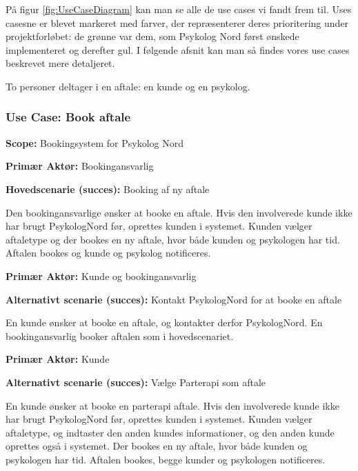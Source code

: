 På figur \ref{fig:UseCaseDiagram} kan man se alle de use cases vi fandt frem til.
Uses casesne er blevet markeret med farver, der repræsenterer deres prioritering under projektforløbet: de grønne var dem, som Psykolog Nord først ønskede implementeret og derefter gul.
I følgende afsnit kan man så findes vores use cases beskrevet mere detaljeret. 

To personer deltager i en aftale: en kunde og en psykolog.

\subsubsection{Use Case: Book aftale}\label{usecase:bookaftale}
{\setlength{\parindent}{0cm}
\textbf{Scope:} Bookingsystem for Psykolog Nord

\textbf{Primær Aktør:} Bookingansvarlig

\textbf{Hovedscenarie (succes):} Booking af ny aftale

Den bookingansvarlige ønsker at booke en aftale.
Hvis den involverede kunde ikke har brugt PsykologNord før, oprettes kunden i systemet.
Kunden vælger aftaletype og der bookes en ny aftale, hvor både kunden og psykologen har tid. 
Aftalen bookes og kunde og psykolog notificeres.

\textbf{Primær Aktør:} Kunde og bookingansvarlig

\textbf{Alternativt scenarie (succes):} Kontakt PsykologNord for at booke en aftale

En kunde ønsker at booke en aftale, og kontakter derfor PsykologNord.
En bookingansvarlig booker aftalen som i hovedscenariet.

\textbf{Primær Aktør:} Kunde

\textbf{Alternativt scenarie (succes):} Vælge Parterapi som aftale

En kunde ønsker at booke en parterapi aftale.
Hvis den involverede kunde ikke har brugt PsykologNord før, oprettes kunden i systemet.
Kunden vælger aftaletype, og indtaster den anden kundes informationer, og den anden kunde oprettes også i systemet.
Der bookes en ny aftale, hvor både kunden og psykologen har tid. 
Aftalen bookes, begge kunder og psykologen notificeres.
}

